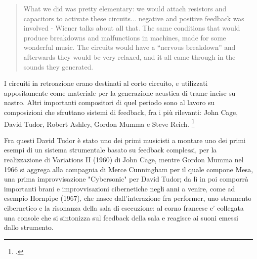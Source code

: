 
\begin{quote}
What we did was pretty elementary: we would attach resistors and capacitors
to activate these
circuits... negative and positive feedback was involved - Wiener
talks about all that. The same
conditions that would produce breakdowns and malfunctions in machines,
made for some
wonderful music. The circuits would have a “nervous breakdown”
and afterwards they would be
very relaxed, and it all came through in the sounds they generated.
\end{quote}

I circuiti in retroazione erano destinati al corto circuito,
e utilizzati appositamente come materiale per la generazione acustica
di trame incise su nastro.
Altri importanti compositori di quel periodo sono al lavoro su composizioni
che sfruttano sistemi di feedback, fra i più rilevanti:
John Cage, David Tudor, Robert Ashley, Gordon Mumma e Steve Reich. \footcite{sanfilippovallefeedsys} 

Fra questi David Tudor è stato uno dei primi musicisti a montare uno dei primi esempi di un sistema strumentale
basato su feedback complessi, per la realizzazione di Variations II (1960) di John Cage,
mentre Gordon Mumma nel 1966 si aggrega alla compagnia di Merce Cunningham per il quale compone Mesa, 
una prima improvvisazione "Cybersonic" per David Tudor; da lì in poi comporrà importanti 
brani e improvvisazioni cibernetiche negli anni a venire, come ad esempio Hornpipe (1967), 
che nasce dall'interazione fra performer, uno strumento cibernetico e la risonanza della sala di esecuzione: 
al corno francese e' collegata una console che si sintonizza sul feedback 
della sala e reagisce ai suoni emessi dallo strumento. 

